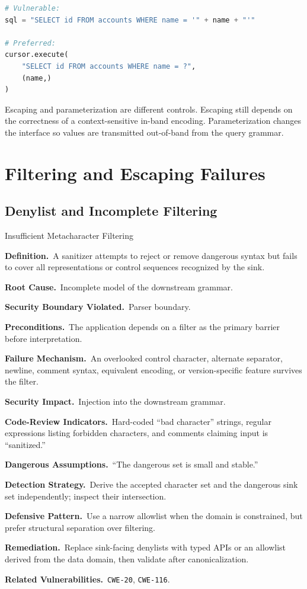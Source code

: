 \documentclass[11pt]{article}
\newcommand{\field}[1]{\par\smallskip\noindent\textbf{#1.}\ }
\newcommand{\cwe}[1]{\texttt{#1}}
\begin{document}
\begin{lstlisting}[language=Python,caption={Parameterization separates query structure from data}]
# Vulnerable:
sql = "SELECT id FROM accounts WHERE name = '" + name + "'"

# Preferred:
cursor.execute(
    "SELECT id FROM accounts WHERE name = ?",
    (name,)
)
\end{lstlisting}

\begin{implementationnote}
Escaping and parameterization are different controls. Escaping still depends on the correctness of a context-sensitive in-band encoding. Parameterization changes the interface so values are transmitted out-of-band from the query grammar.
\end{implementationnote}
\clearpage

\section{Filtering and Escaping Failures}

\subsection{Denylist and Incomplete Filtering}

\begin{catalogbox}{Insufficient Metacharacter Filtering}
\field{Definition}A sanitizer attempts to reject or remove dangerous syntax but fails to cover all representations or control sequences recognized by the sink.

\field{Root Cause}Incomplete model of the downstream grammar.

\field{Security Boundary Violated}Parser boundary.

\field{Preconditions}The application depends on a filter as the primary barrier before interpretation.

\field{Failure Mechanism}An overlooked control character, alternate separator, newline, comment syntax, equivalent encoding, or version-specific feature survives the filter.

\field{Security Impact}Injection into the downstream grammar.

\field{Code-Review Indicators}Hard-coded ``bad character'' strings, regular expressions listing forbidden characters, and comments claiming input is ``sanitized.''

\field{Dangerous Assumptions}``The dangerous set is small and stable.''

\field{Detection Strategy}Derive the accepted character set and the dangerous sink set independently; inspect their intersection.

\field{Defensive Pattern}Use a narrow allowlist when the domain is constrained, but prefer structural separation over filtering.

\field{Remediation}Replace sink-facing denylists with typed APIs or an allowlist derived from the data domain, then validate after canonicalization.

\field{Related Vulnerabilities}\cwe{CWE-20}, \cwe{CWE-116}.
\end{catalogbox}
\clearpage
\end{document}

